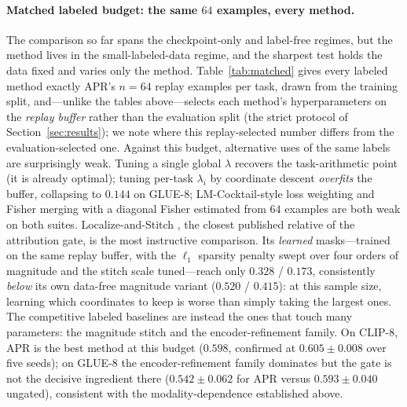 \documentclass[11pt]{article}
\begin{document}
\paragraph{Matched labeled budget: the same $64$ examples, every method.}
The comparison so far spans the checkpoint-only and label-free regimes, but the method lives in the small-labeled-data regime, and the sharpest test holds the data fixed and varies only the method. Table~\ref{tab:matched} gives every labeled method exactly APR's $n=64$ replay examples per task, drawn from the training split, and---unlike the tables above---selects each method's hyperparameters on the \emph{replay buffer} rather than the evaluation split (the strict protocol of Section~\ref{sec:results}); we note where this replay-selected number differs from the evaluation-selected one. Against this budget, alternative uses of the same labels are surprisingly weak. Tuning a single global $\lambda$ recovers the task-arithmetic point (it is already optimal); tuning per-task $\lambda_i$ by coordinate descent \emph{overfits} the buffer, collapsing to $0.144$ on GLUE-8; LM-Cocktail-style loss weighting \citep{xiao2024lmcocktail} and Fisher merging \citep{matena2022fisher} with a diagonal Fisher estimated from $64$ examples are both weak on both suites. Localize-and-Stitch \citep{he2024localize}, the closest published relative of the attribution gate, is the most instructive comparison. Its \emph{learned} masks---trained on the same replay buffer, with the $\ell_1$ sparsity penalty swept over four orders of magnitude and the stitch scale tuned---reach only $0.328$ / $0.173$, consistently \emph{below} its own data-free magnitude variant ($0.520$ / $0.415$): at this sample size, learning which coordinates to keep is worse than simply taking the largest ones. The competitive labeled baselines are instead the ones that touch many parameters: the magnitude stitch and the encoder-refinement family. On CLIP-8, APR is the best method at this budget ($0.598$, confirmed at $0.605\pm0.008$ over five seeds); on GLUE-8 the encoder-refinement family dominates but the gate is not the decisive ingredient there ($0.542\pm0.062$ for APR versus $0.593\pm0.040$ ungated), consistent with the modality-dependence established above.
\end{document}
